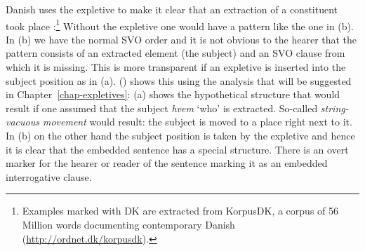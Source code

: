 Danish uses the expletive to make it clear that an extraction of a constituent took place 
\citep[]{MOe2011a}:\footnote{
  Examples marked with DK are extracted from KorpusDK, a corpus of 56 Million words documenting
  contemporary Danish (\url{http://ordnet.dk/korpusdk}).
}
\eal
{}
\zl
Without the expletive one would have a pattern like the one in (b). In (b) we have the
normal SVO order and it is not obvious to the hearer that the pattern consists of an extracted
element (the subject) and an SVO clause from which it is missing. This is more transparent if an
expletive is inserted into the subject position as in (a). () shows this using the
analysis that will be suggested in Chapter~\ref{chap-expletives}: (a) shows the hypothetical
structure that would result if one assumed that the subject \emph{hvem} `who' is
extracted. So-called \emph{string-vacuous movement} would result: the subject is moved to a place
right next to it. In (b) on the other hand the subject position is taken by the expletive and
hence it is clear that the embedded sentence has a special structure. There is an overt marker for
the hearer or reader of the sentence marking it as an embedded interrogative clause.
\eal
{}
\zl

